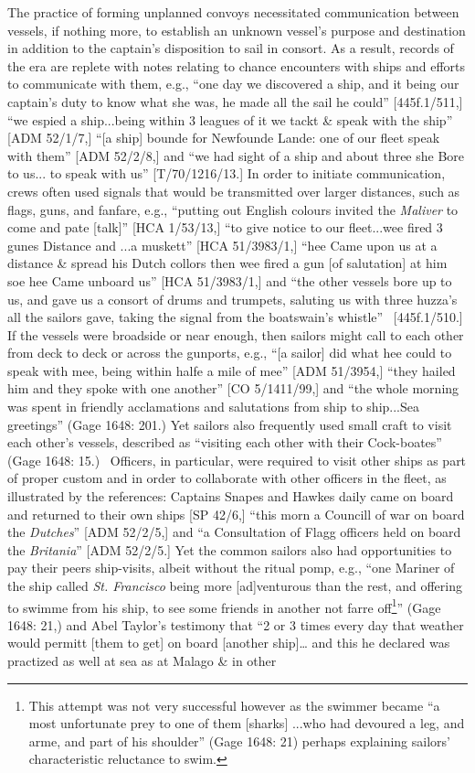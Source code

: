 \documentclass[12pt]{article}
\newenvironment{styleStandard}{\renewcommand\baselinestretch{1.0}\setlength\leftskip{0cm}\setlength\rightskip{0cm plus 1fil}\setlength\parindent{0cm}\setlength\parfillskip{0pt plus 1fil}\setlength\parskip{0in plus 1pt}\writerlistparindent\writerlistleftskip\leavevmode\normalfont\normalsize\writerlistlabel\ignorespaces}{\unskip\vspace{0in plus 1pt}\par}
\newcommand\writerlistleftskip{}
\newcommand\writerlistparindent{}
\newcommand\writerlistlabel{}
\begin{document}
\begin{styleStandard}
The practice of forming unplanned convoys necessitated communication between vessels, if nothing more, to establish an unknown vessel’s purpose and destination in addition to the captain’s disposition to sail in consort. As a result, records of the era are replete with notes relating to chance encounters with ships and efforts to communicate with them, e.g., “one day we discovered a ship, and it being our captain’s duty to know what she was, he made all the sail he could” [445f.1/511,] “we espied a ship...being within 3 leagues of it we tackt \& speak with the ship” [ADM 52/1/7,] “[a ship] bounde for Newfounde Lande: one of our fleet speak with them” [ADM 52/2/8,] and “we had sight of a ship and about three she Bore to us... to speak with us” [T/70/1216/13.] In order to initiate communication, crews often used signals that would be transmitted over larger distances, such as flags, guns, and fanfare, e.g., “putting out English colours invited the \textit{Maliver} to come and pate [talk]” [HCA 1/53/13,] “to give notice to our fleet...wee fired 3 gunes Distance and ...a muskett” [HCA 51/3983/1,] “hee Came upon us at a distance \& spread his Dutch collors then wee fired a gun [of salutation] at him soe hee Came unboard us” [HCA 51/3983/1,] and “the other vessels bore up to us, and gave us a consort of drums and trumpets, saluting us with three huzza’s all the sailors gave, taking the signal from the boatswain’s whistle” \ [445f.1/510.] If the vessels were broadside or near enough, then sailors might call to each other from deck to deck or across the gunports, e.g., “[a sailor] did what hee could to speak with mee, being within halfe a mile of mee” [ADM 51/3954,] “they hailed him and they spoke with one another” [CO 5/1411/99,] and “the whole morning was spent in friendly acclamations and salutations from ship to ship...Sea greetings” (Gage 1648: 201.) Yet sailors also frequently used small craft to visit each other’s vessels, described as “visiting each other with their Cock-boates” (Gage 1648: 15.) \ Officers, in particular, were required to visit other ships as part of proper custom and in order to collaborate with other officers in the fleet, as illustrated by the references: Captains Snapes and Hawkes daily came on board and returned to their own ships [SP 42/6,] “this morn a Councill of war on board the \textit{Dutches}” [ADM 52/2/5,] and “a Consultation of Flagg officers held on board the \textit{Britania}” [ADM 52/2/5.] Yet the common sailors also had opportunities to pay their peers ship-visits, albeit without the ritual pomp, e.g., “one Mariner of the ship called \textit{St. Francisco} being more [ad]venturous than the rest, and offering to swimme from his ship, to see some friends in another not farre off\footnote{ This attempt was not very successful however as the swimmer became “a most unfortunate prey to one of them [sharks] ...who had devoured a leg, and arme, and part of his shoulder” (Gage 1648: 21) perhaps explaining sailors’ characteristic reluctance to swim.}” (Gage 1648: 21,) and Abel Taylor’s testimony that “2 or 3 times every day that weather would permitt [them to get] on board [another ship]… and this he declared was practized as well at sea as at Malago \& in other 
\end{styleStandard}
\end{document}
